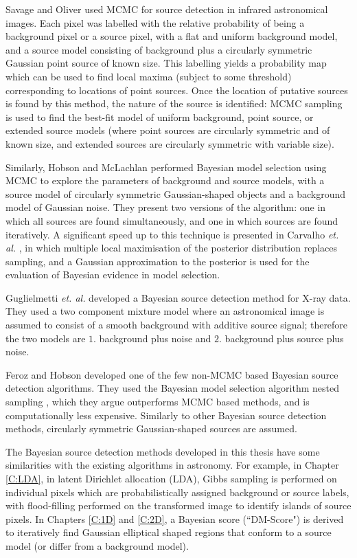 Savage and Oliver \cite{savage2007bayesian} used MCMC for source detection in infrared astronomical images. Each pixel was labelled with the relative probability of being a background pixel or a source pixel, with a flat and uniform background model, and a source model consisting of background plus a circularly symmetric Gaussian point source of known size. This labelling yields a probability map which can be used to find local maxima (subject to some threshold) corresponding to locations of point sources. Once the location of putative sources is found by this method, the nature of the source is identified: MCMC sampling is used to find the best-fit model of uniform background, point source, or extended source models (where point sources are circularly symmetric and of known size, and extended sources are circularly symmetric with variable size).  

Similarly, Hobson and McLachlan \cite{hobson2003bayesian} performed Bayesian model selection using MCMC to explore the parameters of background and source models, with a source model of circularly symmetric Gaussian-shaped objects and a background model of Gaussian noise. They present two versions of the algorithm: one in which all sources are found simultaneously, and one in which sources are found iteratively. A significant speed up to this technique is presented in Carvalho \textit{et. al.} \cite {carvalho2009fast}, in which multiple local maximisation of the posterior distribution replaces sampling, and a Gaussian approximation to the posterior is used for the evaluation of Bayesian evidence in model selection.

Guglielmetti \textit{et. al.} \cite{guglielmetti2009background} developed a Bayesian source detection method for X-ray data. They used a two component mixture model where an astronomical image is assumed to consist of a smooth background with additive source signal; therefore the two models are $1.$ background plus noise and $2.$ background plus source plus noise.

Feroz and Hobson \cite{feroz2008multimodal} developed one of the few non-MCMC based Bayesian source detection algorithms. They used the Bayesian model selection algorithm nested sampling \cite{skilling2004nested}, which they argue outperforms MCMC based methods, and is computationally less expensive. Similarly to other Bayesian source detection methods, circularly symmetric Gaussian-shaped sources are assumed.

The Bayesian source detection methods developed in this thesis have some similarities with the existing algorithms in astronomy. For example, in Chapter \ref{C:LDA}, in latent Dirichlet allocation (LDA), Gibbs sampling is performed on individual pixels which are probabilistically assigned background or source labels, with flood-filling performed on the transformed image to identify islands of source pixels. In Chapters \ref{C:1D} and \ref{C:2D}, a Bayesian score (``DM-Score") is derived to iteratively find Gaussian elliptical shaped regions that conform to a source model (or differ from a background model).

